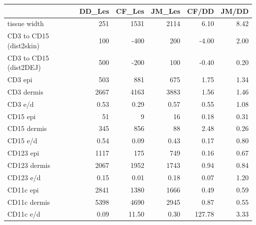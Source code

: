 \documentclass{article}
\begin{document}
\begin{tabular}{lrrrrr}
   \hline  &DD\_Les& CF\_Les& JM\_Les& CF/DD& JM/DD\\ 
\hline
tissue width & 251 & 1531 & 2114 &   6.10 & 8.42 \\ 
  CD3 to CD15 (dist2skin) & 100 & -400 & 200 &  -4.00 & 2.00 \\ 
  CD3 to CD15 (dist2DEJ) & 500 & -200 & 100 &  -0.40 & 0.20 \\ 
   \hline
CD3 epi & 503 & 881 & 675 &   1.75 & 1.34 \\ 
  CD3 dermis & 2667 & 4163 & 3883 &   1.56 & 1.46 \\ 
  CD3 e/d & 0.53 &  0.29 & 0.57 &   0.55 & 1.08 \\ 
   \hline
CD15 epi & 51 & 9 & 16 &   0.18 & 0.31 \\ 
  CD15 dermis & 345 & 856 & 88 &   2.48 & 0.26 \\ 
  CD15 e/d & 0.54 &  0.09 & 0.43 &   0.17 & 0.80 \\ 
   \hline
CD123 epi & 1117 & 175 & 749 &   0.16 & 0.67 \\ 
  CD123 dermis & 2067 & 1952 & 1743 &   0.94 & 0.84 \\ 
  CD123 e/d & 0.15 &  0.01 & 0.18 &   0.07 & 1.20 \\ 
   \hline
CD11c epi & 2841 & 1380 & 1666 &   0.49 & 0.59 \\ 
  CD11c dermis & 5398 & 4690 & 2945 &   0.87 & 0.55 \\ 
  CD11c e/d & 0.09 & 11.50 & 0.30 & 127.78 & 3.33 \\ 
   \hline
\end{tabular}
\end{document}
